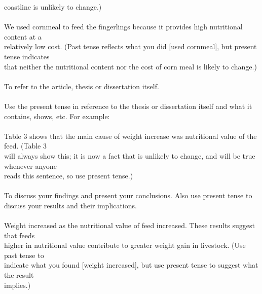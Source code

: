        coastline is unlikely to change.)\\
\\
       We used cornmeal to feed the fingerlings because it provides high nutritional content at a\\
       relatively low cost. (Past tense reflects what you did [used cornmeal], but present tense indicates\\
       that neither the nutritional content nor the cost of corn meal is likely to change.)\\
\\
To refer to the article, thesis or dissertation itself.\\
\\
Use the present tense in reference to the thesis or dissertation itself and what it contains, shows, etc. For example:\\
\\
       Table 3 shows that the main cause of weight increase was nutritional value of the feed. (Table 3\\
       will always show this; it is now a fact that is unlikely to change, and will be true whenever anyone\\
       reads this sentence, so use present tense.)\\
\\
To discuss your findings and present your conclusions. Also use present tense to discuss your results and their implications.\\
\\
       Weight increased as the nutritional value of feed increased. These results suggest that feeds\\
       higher in nutritional value contribute to greater weight gain in livestock. (Use past tense to\\
       indicate what you found [weight increased], but use present tense to suggest what the result\\
       implies.)\\

